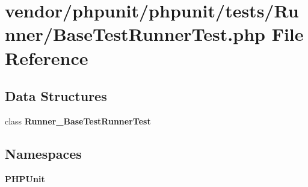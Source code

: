 \section{vendor/phpunit/phpunit/tests/\+Runner/\+Base\+Test\+Runner\+Test.php File Reference}
\label{_base_test_runner_test_8php}
\subsection*{Data Structures}
\begin{DoxyCompactItemize}
\item 
class {\bf Runner\+\_\+\+Base\+Test\+Runner\+Test}
\end{DoxyCompactItemize}
\subsection*{Namespaces}
\begin{DoxyCompactItemize}
\item 
 {\bf P\+H\+P\+Unit}
\end{DoxyCompactItemize}
